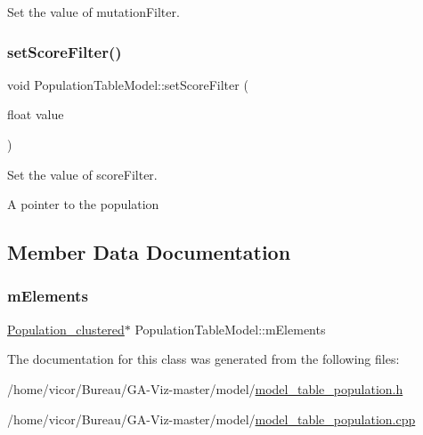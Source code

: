 Set the value of mutation\+Filter. 

\mbox{\label{class_population_table_model_a001b0d530f0cad81a919667a3b3575f8}} 
\subsubsection{\texorpdfstring{set\+Score\+Filter()}{setScoreFilter()}}
{\footnotesize\ttfamily void Population\+Table\+Model\+::set\+Score\+Filter (\begin{DoxyParamCaption}\item[{float}]{value }\end{DoxyParamCaption})}



Set the value of score\+Filter. 

A pointer to the population 

\subsection{Member Data Documentation}
\mbox{\label{class_population_table_model_a3ee2ae16c64538e01d221f89da1fdc40}} 
\subsubsection{\texorpdfstring{m\+Elements}{mElements}}
{\footnotesize\ttfamily \hyperlink{class_population__clustered}{Population\+\_\+clustered}$\ast$ Population\+Table\+Model\+::m\+Elements}



The documentation for this class was generated from the following files\+:\begin{DoxyCompactItemize}
\item 
/home/vicor/\+Bureau/\+G\+A-\/\+Viz-\/master/model/\hyperlink{model__table__population_8h}{model\+\_\+table\+\_\+population.\+h}\item 
/home/vicor/\+Bureau/\+G\+A-\/\+Viz-\/master/model/\hyperlink{model__table__population_8cpp}{model\+\_\+table\+\_\+population.\+cpp}\end{DoxyCompactItemize}
